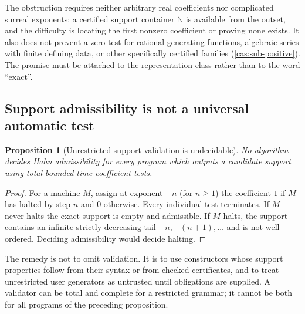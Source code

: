\documentclass[11pt,letterpaper]{article}
\numberwithin{equation}{section}
\newtheorem{proposition}[theorem]{Proposition}
\theoremstyle{definition}
\theoremstyle{remark}
\newcommand{\N}{\mathbb N}
\begin{document}
The obstruction requires neither arbitrary real coefficients nor complicated
surreal exponents: a certified support container $\N$ is available from the
outset, and the difficulty is locating the first nonzero coefficient or proving
none exists. It also does not prevent a zero test for rational generating
functions, algebraic series with finite defining data, or other specifically
certified families (\cref{cas:sub-positive}). The promise must be attached to
the representation class rather than to the word ``exact''.

\subsection{Support admissibility is not a universal automatic test}
\label{cas:sub-validation}
\begin{proposition}[Unrestricted support validation is undecidable]
\label{cas:prop-validation}
No algorithm decides Hahn admissibility for every program which outputs a
candidate support using total bounded-time coefficient tests.
\end{proposition}
\begin{proof}
For a machine $M$, assign at exponent $-n$ (for $n\ge1$) the coefficient $1$ if
$M$ has halted by step $n$ and $0$ otherwise. Every individual test terminates.
If $M$ never halts the exact support is empty and admissible. If $M$ halts, the
support contains an infinite strictly decreasing tail $-n,-(n+1),\dots$ and is
not well ordered. Deciding admissibility would decide halting.
\end{proof}
The remedy is not to omit validation. It is to use constructors whose support
properties follow from their syntax or from checked certificates, and to treat
unrestricted user generators as untrusted until obligations are supplied. A
validator can be total and complete for a restricted grammar; it cannot be both
for all programs of the preceding proposition.
\end{document}
